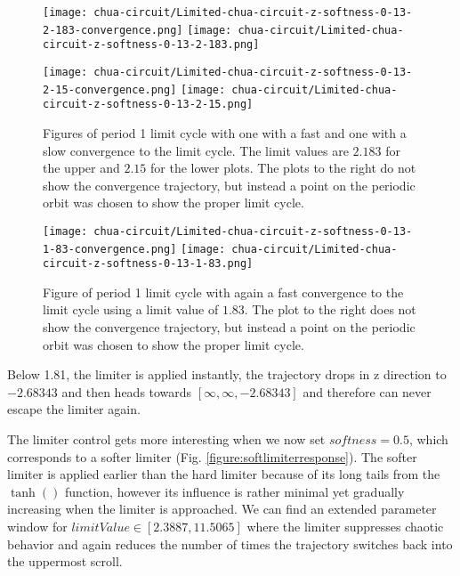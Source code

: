\documentclass[main]{subfiles}
\begin{document}
\begin{figure}[H]
\centering
\texttt{[image: chua-circuit/Limited-chua-circuit-z-softness-0-13-2-183-convergence.png]}
\texttt{[image: chua-circuit/Limited-chua-circuit-z-softness-0-13-2-183.png]}

\texttt{[image: chua-circuit/Limited-chua-circuit-z-softness-0-13-2-15-convergence.png]}
\texttt{[image: chua-circuit/Limited-chua-circuit-z-softness-0-13-2-15.png]}
\caption[Figure of period 1 limit cycle]{Figures of period 1 limit cycle with one with a fast and one with a slow convergence to the limit cycle. The limit values are \(2.183\) for the upper and \(2.15\) for the lower plots. The plots to the right do not show the convergence trajectory, but instead a point on the periodic orbit was chosen to show the proper limit cycle.}
\label{figure:z-1-limit-cycle-ctrajectories}
\end{figure}

\begin{figure}[H]
\centering
\texttt{[image: chua-circuit/Limited-chua-circuit-z-softness-0-13-1-83-convergence.png]}
\texttt{[image: chua-circuit/Limited-chua-circuit-z-softness-0-13-1-83.png]}
\caption[Figure of period 1 limit cycle]{Figure of period 1 limit cycle with again a fast convergence to the limit cycle using a limit value of \(1.83\). The plot to the right does not show the convergence trajectory, but instead a point on the periodic orbit was chosen to show the proper limit cycle.}
\label{figure:z-fast-1-limit-cycle-trajectory}
\end{figure}

Below 1.81, the limiter is applied instantly, the trajectory drops in z direction to \(-2.68343\) and then heads towards \([\infty,\infty,-2.68343]\) and therefore can never escape the limiter again.


The limiter control gets more interesting when we now set \(softness=0.5\), which corresponds to a softer limiter (Fig. \ref{figure:softlimiterresponse}). The softer limiter is applied earlier than the hard limiter because of its long tails from the \(\tanh()\) function, however its influence is rather minimal yet gradually increasing when the limiter is approached. We can find an extended parameter window for \(limitValue \in [2.3887,11.5065]\) where the limiter suppresses chaotic behavior and again reduces the number of times the trajectory switches back into the uppermost scroll.
\end{document}
